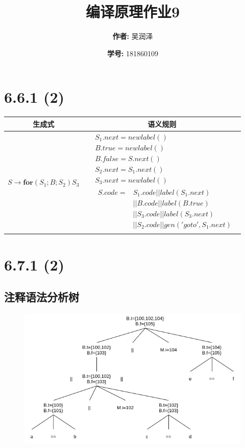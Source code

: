 \documentclass[11pt]{article}
\title{编译原理作业9}
\author{
			\textbf{作者:} {吴润泽}
			\and {\textbf{学号:} 181860109}
		}
\begin{document}
\maketitle
\section*{6.6.1 (2)}
\begin{table}[H]
	\begin{tabular}{|c|c|}
		\hline
		生成式&语义规则\\
		\hline
		$S\to \textbf{for}(S_1;B;S_2)S_3$&
		$\begin{aligned}
		&S_1.next=newlabel()\\
		&B.true=newlabel()\\
		&B.false=S.next()\\
		&S_2.next=S_1.next()\\
		&S_3.next=newlabel()\\
		&\begin{aligned}
		S.code=
		&S_1.code||label(S_1.next)\\
		&||B.code||label(B.true)\\
		&||S_3.code||label(S_3.next)\\
		&||S_2.code||gen('goto',S_1.next)
		\end{aligned}
		\end{aligned}
		$\\
		\hline
	\end{tabular}
\end{table}
\section*{6.7.1 (2)}
\subsection*{注释语法分析树}
\begin{figure}[H]
	\centering
	\includegraphics[width=\linewidth]{6.7.1-tree.png}
\end{figure}
\end{document}

